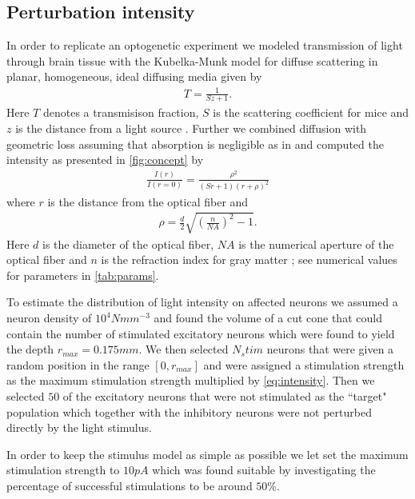 \documentclass[11pt]{article}
\begin{document}
\subsection{Perturbation intensity}\label{sec:method:opto}
In order to replicate an optogenetic experiment we modeled transmission of light through brain tissue with the Kubelka-Munk model for diffuse scattering in planar, homogeneous, ideal diffusing media given by
\begin{align}
T = \frac{1}{Sz + 1}.
\end{align}
Here $ T $ denotes a transmisison fraction, $ S $ is the scattering coefficient for mice \citep{Aravanis2007} and $ z $ is the distance from a light source \citep{Ho2017}. Further we combined diffusion with geometric loss assuming that absorption is negligible as in \cite{Aravanis2007} and computed the intensity as presented in \cref{fig:concept} by
\begin{align}
\label{eq:intensity}
\frac{I(r)}{I(r=0)} = \frac{\rho^2}{(Sr + 1)(r + \rho)^2}
\end{align}
where $ r $ is the distance from the optical fiber and
\begin{align}
\rho = \frac{d}{2}\sqrt{\left(\frac{n}{NA}\right)^2 - 1}.
\end{align}
Here $ d $ is the diameter of the optical fiber, $ NA $ is the numerical aperture of the optical fiber and $ n $ is the refraction index for gray matter \citep{Ho2017}; see numerical values for parameters in \cref{tab:params}.

To estimate the distribution of light intensity on affected neurons we assumed a neuron density of $ 10^4 Nmm^{-3} $ and found the volume of a cut cone that could contain the number of stimulated excitatory neurons which were found to yield the depth $ r_{max} = 0.175 mm $. We then selected $ N_stim $ neurons that were given a random position in the range $ [0, r_{max}] $ and were assigned a stimulation strength as the maximum stimulation strength multiplied by \cref{eq:intensity}. Then we selected $ 50 $ of the excitatory neurons that were not stimulated as the ``target" population which together with the inhibitory neurons were not perturbed directly by the light stimulus.

In order to keep the stimulus model as simple as possible we let set the maximum stimulation strength to $ 10 pA $ which was found suitable by investigating the percentage of successful stimulations to be around $ 50\% $.

\pagestyle{empty}

{\footnotesize\linespread{1}
}
\end{document}
